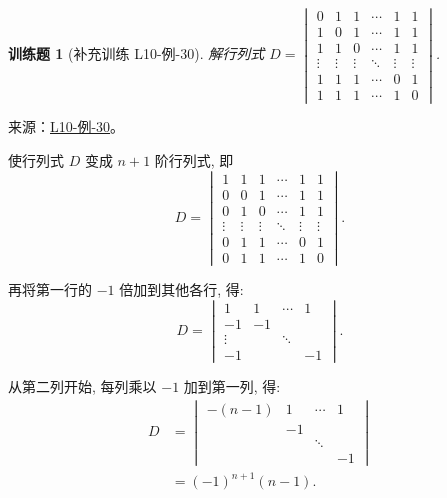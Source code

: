 \documentclass[12pt,fontset=fandol]{ctexart}
\newtheorem{exercise}{训练题}[section]
\begin{document}
\begin{exercise}[补充训练 L10-例-30]\label{prob:L10-例-30}
解行列式 $D=\begin{vmatrix}
            0      & 1      & 1      & \cdots & 1      & 1      \\
            1      & 0      & 1      & \cdots & 1      & 1      \\
            1      & 1      & 0      & \cdots & 1      & 1      \\
            \vdots & \vdots & \vdots & \ddots & \vdots & \vdots \\
            1      & 1      & 1      & \cdots & 0      & 1      \\
            1      & 1      & 1      & \cdots & 1      & 0
        \end{vmatrix}$.
\end{exercise}
\noindent 来源：\href{https://github.com/yhwu-is/Linear-Algebra-Left-Undone/blob/new/%E8%AE%B2%E4%B9%89/%E4%B8%93%E9%A2%98/10%20%E8%A1%8C%E5%88%97%E5%BC%8F.tex}{L10-例-30}。
\begin{solve}
使行列式 $D$ 变成 $n+1$ 阶行列式, 即
    \[ D=\begin{vmatrix}
            1      & 1      & 1      & \cdots & 1      & 1      \\
            0      & 0      & 1      & \cdots & 1      & 1      \\
            0      & 1      & 0      & \cdots & 1      & 1      \\
            \vdots & \vdots & \vdots & \ddots & \vdots & \vdots \\
            0      & 1      & 1      & \cdots & 0      & 1      \\
            0      & 1      & 1      & \cdots & 1      & 0
        \end{vmatrix}. \]

    再将第一行的 $-1$ 倍加到其他各行, 得:
    \[ D =\begin{vmatrix}
            1      & 1  & \cdots & 1  \\
            -1     & -1 &        &    \\
            \vdots &    & \ddots &    \\
            -1     &    &        & -1
        \end{vmatrix}. \]

    从第二列开始, 每列乘以 $-1$ 加到第一列, 得:
    \begin{align*}
        D & =\begin{vmatrix}
                 -(n-1) & 1  & \cdots & 1  \\
                        & -1 &        &    \\
                        &    & \ddots &    \\
                        &    &        & -1
             \end{vmatrix} \\
          & =(-1)^{n+1}(n-1).
    \end{align*}
\end{solve}
\end{document}

